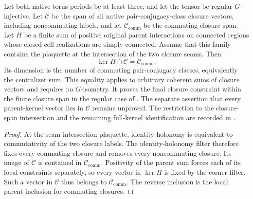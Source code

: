 \begin{lemma}%
    \label{thm:peps_regular_closure_kernel_intersection}
    \leanok
    Let both native torus periods be at least three, and let the
    tensor be regular $G$-injective. Let $\mathcal C$ be the span
    of all native pair-conjugacy-class closure vectors, including
    noncommuting labels, and let $\mathcal C_{\mathrm{comm}}$ be
    the commuting closure span. Let $H$ be a finite sum of positive
    original parent interactions on connected regions whose
    closed-cell realizations are simply connected. Assume
    that this family contains the plaquette at the intersection
    of the two closure seams. Then
    \[
        \ker H\cap\mathcal C=\mathcal C_{\mathrm{comm}}.
    \]
    Its dimension is the number of commuting pair-conjugacy
    classes, equivalently the centralizer sum.
    This equality applies to arbitrary coherent sums of closure
    vectors and requires no $G$-isometry. It proves the final
    closure constraint within the finite closure span in the
    regular case of \cite[Theorem~5.5]{Schuch2010PEPS}.
    The separate assertion that every parent-kernel vector lies
    in $\mathcal C$ remains unproved.
    The restriction to the closure-span intersection and the remaining full-kernel identification are recorded in
    \cite{gap:rmp_peps_quantum_double_g_isometry}.
\end{lemma}

\begin{proof}\leanok
    At the seam-intersection plaquette, identity holonomy is
    equivalent to commutativity of the two closure labels. The
    identity-holonomy filter therefore fixes every commuting
    closure and removes every noncommuting closure. Its image
    of $\mathcal C$ is contained in
    $\mathcal C_{\mathrm{comm}}$. Positivity of the parent sum
    forces each of its local constraints separately, so every
    vector in $\ker H$ is fixed by the corner filter. Such a
    vector in $\mathcal C$ thus belongs to
    $\mathcal C_{\mathrm{comm}}$. The reverse inclusion is the
    local parent inclusion for commuting closures.
\end{proof}
